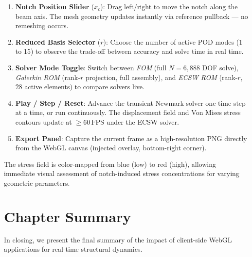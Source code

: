 \begin{enumerate}[noitemsep, leftmargin=1.5em]
    \item \textbf{Notch Position Slider} ($x_c$): Drag left/right to move the notch along the beam axis. The mesh geometry updates instantly via reference pullback — no remeshing occurs.
    \item \textbf{Reduced Basis Selector} ($r$): Choose the number of active POD modes (1 to 15) to observe the trade-off between accuracy and solve time in real time.
    \item \textbf{Solver Mode Toggle}: Switch between \emph{FOM} (full $N=6{,}888$ DOF solve), \emph{Galerkin ROM} (rank-$r$ projection, full assembly), and \emph{ECSW ROM} (rank-$r$, 28 active elements) to compare solvers live.
    \item \textbf{Play / Step / Reset}: Advance the transient Newmark solver one time step at a time, or run continuously. The displacement field and Von Mises stress contours update at $\ge 60\,\text{FPS}$ under the ECSW solver.
    \item \textbf{Export Panel}: Capture the current frame as a high-resolution PNG directly from the WebGL canvas (injected overlay, bottom-right corner).
\end{enumerate}

The stress field is color-mapped from blue (low) to red (high), allowing immediate visual assessment of notch-induced stress concentrations for varying geometric parameters.



\section{Chapter Summary}

In closing, we present the final summary of the impact of client-side WebGL applications for real-time structural dynamics.

